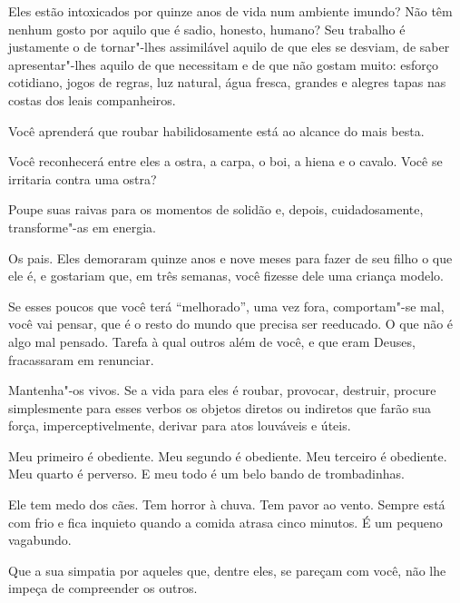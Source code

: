 Eles estão intoxicados por quinze anos de vida num ambiente imundo? Não
têm nenhum gosto por aquilo que é sadio, honesto, humano? Seu trabalho é
justamente o de tornar"-lhes assimilável aquilo de que eles se desviam,
de saber apresentar"-lhes aquilo de que necessitam e de que não gostam
muito: esforço cotidiano, jogos de regras, luz natural, água fresca,
grandes e alegres tapas nas costas dos leais companheiros.

\bigskip
\bigskip

Você aprenderá que roubar habilidosamente está ao alcance do mais besta.

\bigskip
\bigskip

Você reconhecerá entre eles a ostra, a carpa, o boi, a hiena e o cavalo.
Você se irritaria contra uma ostra?

\bigskip
\bigskip

Poupe suas raivas para os momentos de solidão e, depois, cuidadosamente,
transforme"-as em energia.

\bigskip
\bigskip

Os pais. Eles demoraram quinze anos e nove meses para fazer de seu filho
o que ele é, e gostariam que, em três semanas, você fizesse dele uma
criança modelo.

\bigskip
\bigskip

Se esses poucos que você terá ``melhorado'', uma vez fora, comportam"-se
mal, você vai pensar, que é o resto do mundo que precisa ser reeducado.
O que não é algo mal pensado. Tarefa à qual outros além de você, e que
eram Deuses, fracassaram em renunciar.

\bigskip
\bigskip

Mantenha"-os vivos. Se a vida para eles é roubar, provocar, destruir,
procure simplesmente para esses verbos os objetos diretos ou indiretos
que farão sua força, imperceptivelmente, derivar para atos louváveis e
úteis.

\bigskip
\bigskip

Meu primeiro é obediente. Meu segundo é obediente. Meu terceiro é
obediente. Meu quarto é perverso. E meu todo é um belo bando de
trombadinhas.

\bigskip
\bigskip

Ele tem medo dos cães. Tem horror à chuva. Tem pavor ao vento. Sempre
está com frio e fica inquieto quando a comida atrasa cinco minutos. É um
pequeno vagabundo.

\bigskip
\bigskip

Que a sua simpatia por aqueles que, dentre eles, se pareçam com você,
não lhe impeça de compreender os outros.


